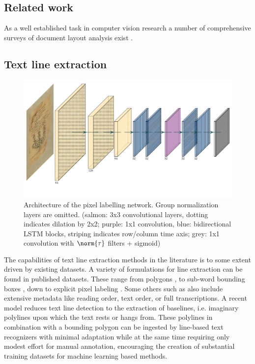 \subsection{Related work}

As a well established task in computer vision research a number of
comprehensive surveys of document layout analysis exist
\cite{binmakhashen2019document, eskenazi:hal-01388088, nagy2000twenty}. 

\subsection{Text line extraction}

\begin{figure}[ht]
        \centering
        \includegraphics[width=\textwidth]{rblla}
	\caption{Architecture of the pixel labelling network. Group
	normalization layers are omitted. (salmon: 3x3 convolutional layers,
	dotting indicates dilation by 2x2; purple: 1x1 convolution, blue:
	bidirectional LSTM blocks, striping indicates row/column time axis;
	grey: 1x1 convolution with $\norm{\tau}$ filters + sigmoid)}
	\label{fig:rblla}
\end{figure}

The capabilities of text line extraction methods in the literature is to some
extent driven by existing datasets. A variety of formulations for line
extraction can be found in published datasets. These range from polygons
\cite{fischer2011transcription,simistira2016diva,clausner2018icfhr}, to
sub-word bounding boxes \cite{kassis2017vml}, down to explicit pixel labeling
\cite{gatos2010icfhr}. Some others such as
\cite{antonacopoulos2015icdar2015,antonacopoulos2011historical} also include
extensive metadata like reading order, text order, or full transcriptions. A
recent model \cite{diem2017cbad} reduces text line detection to the extraction
of baselines, i.e. imaginary polylines upon which the text rests or hangs from.
These polylines in combination with a bounding polygon can be ingested by
line-based text recognizers with minimal adaptation while at the same time
requiring only modest effort for manual annotation, encouraging the creation of
substantial training datasets for machine learning based methods.

